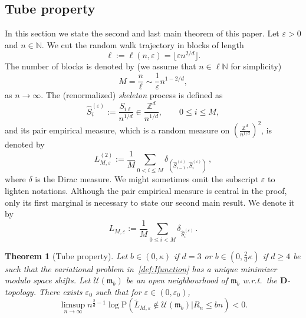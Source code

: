 \documentclass[a4paper,11pt]{amsart}
\numberwithin{equation}{section}
\newtheorem{theorem}{Theorem}[section]
\newcommand{\bbN}{{\ensuremath{\mathbb N}} }
\newcommand{\bbR}{{\ensuremath{\mathbb R}} }
\newcommand{\bbZ}{{\ensuremath{\mathbb Z}} }
\newcommand{\cU}{{\ensuremath{\mathcal U}} }
\newcommand{\gd}{\delta}
\newcommand{\gep}{\varepsilon}
\newcommand{\bfD}{\mathbf{D}}
\renewcommand{\tilde}{\widetilde}          %
\newcommand{\dd}{\text{\rm d}}             %
\newcommand\bP{\ensuremath{\mathrm{P}}}
\newcommand{\sL}{\mathscr{L}}
\newcommand{\8}{\infty}
\newcommand{\beq}{\begin{equation}}
\newcommand{\eeq}{\end{equation}}
\newcommand{\fm}{\mathfrak{m}}
\begin{document}
\subsection{Tube property}
\label{sec:tube-pro} 
In this section we state the second and last main theorem of this paper.
Let $\gep>0$ and $n\in \bbN$. We cut the random walk trajectory in blocks of length
\beq
\ell := \ell(n,\gep) = \lfloor \gep n ^{2/d} \rfloor.
\eeq
The number of blocks is denoted by (we assume that $n\in \ell \bbN$ for simplicity)
\beq\label{eq:M}
M = \frac n \ell \sim \frac1\gep n^{1-2/d},
\eeq
as $n\to \infty$. The (renormalized) {\it skeleton} process is defined as
\beq
\hat S_i^{(\gep)} := \frac{S_{i\ell}}{n^{1/d}} \in \frac{\bbZ^d}{n^{1/d}},
\qquad 0\le i \le M,
\eeq
and its pair empirical measure, which is a random measure on $(\frac{\bbZ^d}{n^{1/d}})^2$, is denoted by
\beq
\label{eq:def-PEMa}
L_{M,\gep}^{(2)} :=\frac{1}{M} \sum_{0< i \le M} \gd_{(\hat S_{i-1}^{(\gep)}, \hat S_{i}^{(\gep)})}\,,
\eeq
where $\gd$ is the Dirac measure. We might sometimes omit the subscript $\gep$ to lighten notations. 
Although the pair empirical measure is central in the proof, only its first marginal is necessary to state our second main result. We denote it by
\beq
L_{M,\gep} :=\frac{1}{M} \sum_{0\le i < M} \gd_{\hat S_{i}^{(\gep)}}\,.
\eeq
%
\begin{theorem}[Tube property]
\label{thm:2}
Let $b\in(0,\kappa)$ if $d=3$ or $b\in(0,\tfrac 2 d \kappa)$ if $d\ge 4$ be such that the variational problem in~\eqref{def:Ifunction} has a unique minimizer modulo space shifts. Let $\cU(\fm_b)$ be an open neighbourhood of $\fm_b$ w.r.t.\ the $\bfD$-topology. There exists $\gep_0$ such that for $\gep\in(0,\gep_0)$,
\beq
\limsup_{n\to \infty} n^{\frac{2}{d}-1} \log \bP(\tilde L_{M,\gep} \notin \cU(\fm_b) | R_n \le bn) <0.
\eeq
\end{theorem}
\end{document}

